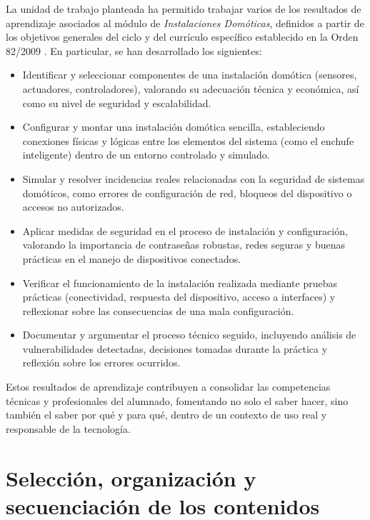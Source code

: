 La unidad de trabajo planteada ha permitido trabajar varios de los resultados de aprendizaje asociados al módulo de \textit{Instalaciones Domóticas}, definidos a partir de los objetivos generales del ciclo y del currículo específico establecido en la Orden 82/2009 \cite{Orden82_2009}. En particular, se han desarrollado los siguientes:

\begin{itemize}
  \item Identificar y seleccionar componentes de una instalación domótica (sensores, actuadores, controladores), valorando su adecuación técnica y económica, así como su nivel de seguridad y escalabilidad.

  \item Configurar y montar una instalación domótica sencilla, estableciendo conexiones físicas y lógicas entre los elementos del sistema (como el enchufe inteligente) dentro de un entorno controlado y simulado.

  \item Simular y resolver incidencias reales relacionadas con la seguridad de sistemas domóticos, como errores de configuración de red, bloqueos del dispositivo o accesos no autorizados.

  \item Aplicar medidas de seguridad en el proceso de instalación y configuración, valorando la importancia de contraseñas robustas, redes seguras y buenas prácticas en el manejo de dispositivos conectados.

  \item Verificar el funcionamiento de la instalación realizada mediante pruebas prácticas (conectividad, respuesta del dispositivo, acceso a interfaces) y reflexionar sobre las consecuencias de una mala configuración.

  \item Documentar y argumentar el proceso técnico seguido, incluyendo análisis de vulnerabilidades detectadas, decisiones tomadas durante la práctica y reflexión sobre los errores ocurridos.
\end{itemize}

Estos resultados de aprendizaje contribuyen a consolidar las competencias técnicas y profesionales del alumnado, fomentando no solo el saber hacer, sino también el saber por qué y para qué, dentro de un contexto de uso real y responsable de la tecnología.


\section{Selección, organización y secuenciación de los contenidos}

